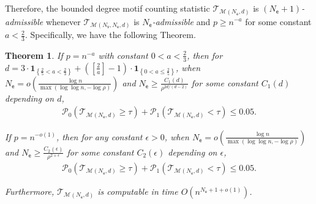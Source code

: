 \documentclass[letterpaper,11pt]{article}
\newtheorem{theorem}{Theorem}
\theoremstyle{definition}
\newcommand{\maM}{\mathcal{M}}
\newcommand{\maP}{\mathcal{P}}
\newcommand{\maT}{\mathcal{T}}
\newcommand{\en}{\mathsf{{e}}}
\newcommand{\vn}{\mathsf{{v}}}
\newcommand{\pth}[1]{\left( #1 \right)}
\newcommand{\qth}[1]{\left[ #1 \right]}
\newcommand{\sfM}{{\mathsf{M}}}
\newcommand{\sfe}{{\mathsf{e}}}
\newcommand{\sfv}{{\mathsf{v}}}
\newcommand{\indc}[1]{{\mathbf{1}_{\left\{{#1}\right\}}}}
\begin{document}
Therefore, the bounded degree motif counting statistic $\maT_{\maM(N_\sfe,d)}$ is \emph{$(N_\sfe{+}1)$-admissible} whenever $\maT_{\maM(N_\sfv,N_\sfe,d)}$ is \emph{$N_\sfe$-admissible} and $p\ge n^{-a}$ for some constant $a<\frac{2}{3}$. Specifically, we have the following Theorem.
\begin{theorem}\label{thm:bd-degree-motif-general}
      If $p=n^{-a}$ with constant $0<a< \frac{2}{3}$, then for $d=3\cdot \indc{\frac{2}{5}<a<\frac{2}{3}}+\pth{\qth{\frac{2}{a}}-1}\cdot \indc{0<a\le \frac{2}{5}}$, when $N_\sfe=o\pth{\frac{\log n}{\max\pth{\log\log n,-\log\rho}}}$ and $N_\sfe\ge \frac{C_1(d)}{\rho^{2d/(d-2)}}$ for some constant $C_1(d)$ depending on $d$,\begin{align*}
        \maP_0\pth{\maT_{\maM(N_\sfe,d)}\ge \tau}+\maP_1\pth{\maT_{\maM(N_\sfe,d)}<\tau}\le 0.05.
    \end{align*}

    If $p=n^{-o(1)}$, then for any constant $\epsilon>0$, when $N_\sfe = o\pth{\frac{\log n}{\max\pth{\log\log n,-\log\rho}}}$ and $N_\sfe\ge \frac{C_2(\epsilon)}{\rho^{2+\epsilon}}$ for some constant $C_2(\epsilon)$ depending on $\epsilon$,\begin{align*}
        \maP_0\pth{\maT_{\maM(N_\sfe,d)}\ge \tau}+\maP_1\pth{\maT_{\maM(N_\sfe,d)}<\tau}\le 0.05.
    \end{align*}

    Furthermore, $\maT_{\maM(N_\sfe,d)}$ is  computable in time $O(n^{N_\sfe+1+o(1)})$.
\end{theorem}
\end{document}
